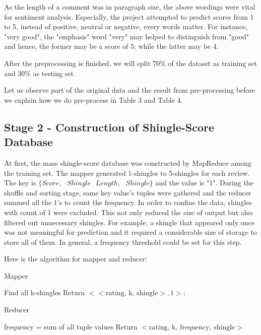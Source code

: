 As the length of a comment was in paragraph size, the above wordings were vital for sentiment analysis. Especially, the project attempted to predict scores from 1 to 5, instead of positive, neutral or negative, every words matter. For instance, "very good", the "emphasis" word "very" may helped to distinguish from "good" and hence, the former may be a score of 5; while the latter may be 4.

After the preprocessing is finished, we will split 70\% of the dataset as training set and 30\% as testing set.

Let us observe part of the original data and the result from pre-processing before we explain how we do pre-process in Table 3 and Table 4.




\subsection{Stage 2 - Construction of Shingle-Score Database}
At first, the mass shingle-score database was constructed by MapReduce among the training set. The mapper generated 1-shingles to 5-shingles for each review. The key is \(\{Score,\mbox{ } Shingle\mbox{ } Length,\mbox{ } Shingle\}\) and the value is "1". During the shuffle and sorting stage, same key value's tuples were gathered and the reducer summed all the 1's to count the frequency. In order to confine the data, shingles with count of 1 were excluded.
This not only reduced the size of output but also filtered out unnecessary shingles. For example, a shingle that appeared only once was not meaningful for prediction and it required a considerable size of storage to store all of them.
In general, a frequency threshold could be set for this step.

Here is the algorithm for mapper and reducer:
\begin{algorithm}
\DontPrintSemicolon
{}
\caption{Mapper}
	{
		{
			\label{forins}
			Find all k-shingles\;
			{
				Return \(<<\mbox{rating, k, shingle}>, 1>\);
			}
 		}
	}
\end{algorithm}

\begin{algorithm}
\DontPrintSemicolon
{}

\caption{Reducer}
	 {
		frequency = sum of all tuple values\;
		Return \(<\mbox{rating, k, frequency, shingle}>\)\;
	}
\end{algorithm}

